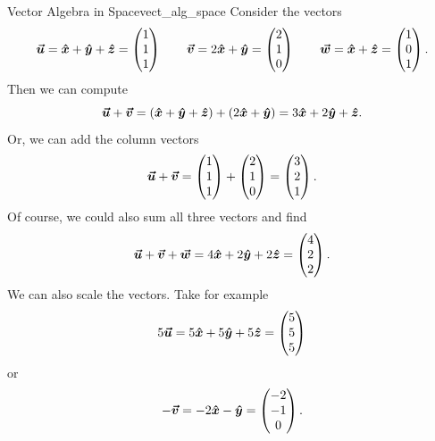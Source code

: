         \begin{ex}{Vector Algebra in Space}{vect_alg_space}
            Consider the vectors
            \[
            \vecu = \xhat + \yhat + \zhat = \begin{pmatrix} 1 \\ 1 \\ 1\end{pmatrix} \qquad \vecv = 2\xhat + \yhat = \begin{pmatrix} 2 \\ 1 \\ 0 \end{pmatrix} \qquad \vecw = \xhat + \zhat = \begin{pmatrix} 1 \\ 0 \\ 1 \end{pmatrix}.
            \]
            Then we can compute 
            \[
            \vecu+\vecv = (\xhat+\yhat+\zhat)+(2\xhat + \yhat) = 3\xhat + 2\yhat + \zhat.
            \]
            Or, we can add the column vectors
            \[
            \vecu+\vecv = \begin{pmatrix} 1 \\ 1 \\ 1 \end{pmatrix} + \begin{pmatrix} 2 \\ 1 \\ 0 \end{pmatrix} = \begin{pmatrix} 3 \\ 2 \\ 1 \end{pmatrix}.
            \]
            Of course, we could also sum all three vectors and find
            \[
            \vecu+\vecv+\vecw = 4\xhat + 2\yhat + 2 \zhat = \begin{pmatrix} 4 \\ 2 \\ 2 \end{pmatrix}.
            \]
            We can also scale the vectors. Take for example
            \[
            5 \vecu = 5\xhat + 5\yhat + 5\zhat = \begin{pmatrix} 5 \\ 5 \\ 5 \end{pmatrix}
            \]
            or
            \[
            - \vecv = -2\xhat -\yhat = \begin{pmatrix} -2 \\ -1 \\ 0 \end{pmatrix}.
\]
\end{ex}
